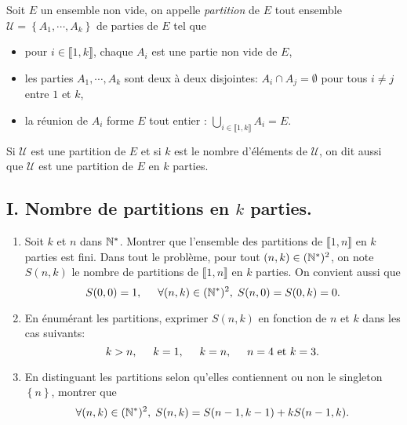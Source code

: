 Soit $E$ un ensemble non vide, on appelle \emph{partition} de $E$ tout ensemble $\mathcal{U} = \left\lbrace A_1, \cdots , A_k\right\rbrace$ de parties de $E$ tel que 
\begin{itemize}
 \item pour $i \in \llbracket 1,k \rrbracket$, chaque $A_i$ est une partie non vide de $E$,
 \item les parties $A_1, \cdots, A_k$ sont deux à deux disjointes: $A_i \cap A_j = \emptyset$ pour tous $i\neq j$ entre $1$ et $k$,
 \item la réunion de $A_i$ forme $E$ tout entier : $\bigcup_{i \in \llbracket 1,k \rrbracket} A_i = E$.
\end{itemize}
Si $\mathcal{U}$ est une partition de $E$ et si $k$ est le nombre d'éléments de $\mathcal{U}$, on dit aussi que $\mathcal{U}$ est une partition de $E$ en $k$ parties.

\subsection*{I. Nombre de partitions en $k$ parties.}
\begin{enumerate}
 \item Soit $k$ et $n$ dans $\mathbb{N}^*$. Montrer que l'ensemble des partitions de $\llbracket 1,n \rrbracket$ en $k$ parties est fini.\newline
 Dans tout le problème, pour tout $(n,k) \in (\mathbb{N}^*)^2$, on note $S(n,k)$ le nombre de partitions de $\llbracket 1,n \rrbracket$ en $k$ parties. On convient aussi que
\[
 S(0,0)= 1, \hspace{0.5cm} \forall (n,k) \in (\mathbb{N}^*)^2, \; S(n,0) = S(0,k) = 0. 
\]
 \item En énumérant les partitions, exprimer $S(n,k)$ en fonction de $n$ et $k$ dans les cas suivants:
\[
 k > n, \hspace{0.5cm} k = 1, \hspace{0.5cm} k = n, \hspace{0.5cm} n = 4 \text{ et } k = 3.
\]
 \item En distinguant les partitions selon qu'elles contiennent ou non le singleton $\left\lbrace n \right\rbrace$, montrer que
\[
 \forall (n,k) \in (\mathbb{N}^*)^2,\; S(n,k) = S(n-1,k-1) + kS(n-1,k).
\]
\end{enumerate}

